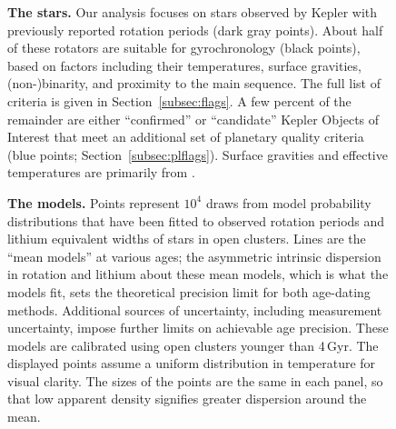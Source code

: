\documentclass[11pt,twocolumn,tighten]{aastex63}
\begin{document}
\begin{figure}[!t]
	\begin{center}
%	
	\end{center}
	\vspace{-0.5cm}
	\caption{
    {\bf The stars.}  Our analysis focuses on stars observed
    by Kepler with previously reported rotation periods (dark gray
    points).  About half of these rotators are suitable for
    gyrochronology (black points), based on factors including their
    temperatures, surface gravities, (non-)binarity, and proximity to
    the main sequence.  The full list of criteria is given in
    Section~\ref{subsec:flags}.  A few percent of the remainder are
    either ``confirmed'' or ``candidate'' Kepler Objects of Interest
    that meet an additional set of planetary quality criteria (blue points;
    Section~\ref{subsec:plflags}).  
    Surface gravities and effective
    temperatures are primarily from
    \citet{Berger_2020a_catalog}.
	}
	\label{fig:stellarprops}
\end{figure}

\begin{figure}[!t]
	\begin{center}
		\leavevmode
	\end{center}
	\vspace{-0.6cm}
	\caption{
		{\bf The models.}
		Points represent $10^4$ draws from model probability distributions
		that have been fitted to observed rotation periods
		\citep{Bouma_2023} and lithium equivalent widths
		\citep[EWs;][]{Jeffries_2023} of stars in open clusters.  Lines
		are the ``mean models'' at various ages; the asymmetric intrinsic
		dispersion in rotation and lithium about these mean models, which
		is what the models fit, sets the theoretical precision limit for
		both age-dating methods.		Additional sources of uncertainty,
		including measurement uncertainty, impose further limits on
		achievable age precision.  These models are calibrated using open
		clusters younger than 4\,Gyr.  The displayed points assume a
		uniform distribution in temperature for visual clarity.
		The sizes of the points are the same in each panel, so that low
		apparent density signifies greater dispersion around the mean.
		\label{fig:models}
	}
\end{figure}
\end{document}
